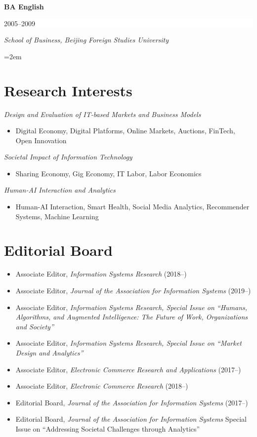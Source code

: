 \documentclass[paper=letter,fontsize=10pt]{scrartcl} %
\newcommand{\NewPart}[2]{\section*{{#1} #2}}
\newcommand{\EducationEntry}[4]{
		\noindent \textbf{#1} \hfill      %
		\colorbox{White}{%
			\parbox{6em}{%
			\hfill\color{Black}#2}} \par  %
		\noindent \textit{#3} \par        %
		\noindent\hangindent=2em\hangafter=0 \small #4 %
		\normalsize \par}
\begin{document}
\vspace{6px}
\EducationEntry{BA English}{2005--2009}{School of Business, Beijing Foreign Studies University}{} %

\newpage

\NewPart{Research Interests}{}
\textit{Design and Evaluation of IT-based Markets and Business Models}
\begin{itemize}
\item{Digital Economy, Digital Platforms, Online Markets, Auctions, FinTech, Open Innovation}
\end{itemize}
\textit{Societal Impact of Information Technology}
\begin{itemize}
\item{Sharing Economy, Gig Economy, IT Labor, Labor Economics}
\end{itemize}
\textit{Human-AI Interaction and Analytics}
\begin{itemize}
\item{Human-AI Interaction, Smart Health, Social Media Analytics, Recommender Systems, Machine Learning}
\end{itemize}

\NewPart{Editorial Board}{}
\begin{itemize}
\item Associate Editor, \emph{Information Systems Research} (2018--)
\item Associate Editor, \emph{Journal of the Association for Information Systems} (2019--)
\item Associate Editor, \emph{Information Systems Research, Special Issue on ``Humans, Algorithms, and Augmented Intelligence: The Future of Work, Organizations and Society''}
\item Associate Editor, \emph{Information Systems Research, Special Issue on ``Market Design and Analytics''}
\item Associate Editor, \emph{Electronic Commerce Research and Applications} (2017--)
\item Associate Editor, \emph{Electronic Commerce Research} (2018--)
\item Editorial Board, \emph{Journal of the Association for Information Systems} (2017--)
\item Editorial Board, \emph{Journal of the Association for Information Systems} Special Issue on ``Addressing Societal Challenges through Analytics''
\end{itemize}



\end{document}
